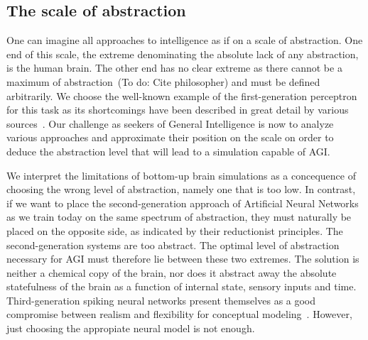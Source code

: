 \subsection{The scale of abstraction}
One can imagine all approaches to intelligence as if on a scale of abstraction.
One end of this scale, the extreme denominating the absolute lack of any abstraction, is the human brain.
The other end has no clear extreme as there cannot be a maximum of abstraction~(To do: Cite philosopher) and must 
be defined arbitrarily. We choose the well-known example of the first-generation perceptron for this task as its
shortcomings have been described in great detail by various sources~\cite{Anderson1995}.
Our challenge as seekers of General Intelligence is now to analyze various approaches and approximate their position on
the scale on order to deduce the abstraction level that will lead to a simulation capable of AGI\@.

We interpret the limitations of bottom-up brain simulations as a concequence of choosing the wrong level of abstraction, 
namely one that is too low. In contrast, if we want to place the second-generation approach of Artificial Neural Networks as we train today on
the same spectrum of abstraction, they must naturally be placed on the opposite side, as indicated by their reductionist
principles. The second-generation systems are too abstract. The optimal level of abstraction necessary for AGI must 
therefore lie between these two extremes. The solution is neither a chemical copy of the brain, nor does it abstract 
away the absolute statefulness of the brain as a function of internal state, sensory inputs and time.
Third-generation spiking neural networks present themselves as a good compromise between
realism and flexibility for conceptual modeling~\cite{Paugam-Moisy2012}. However, just choosing the appropiate
neural model is not enough. 

\bigskip



